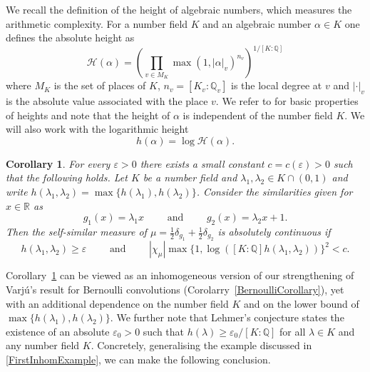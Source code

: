 \documentclass[10pt, english,oneside,reqno]{amsart}
\theoremstyle{plain}
\newtheorem{corollary}[theorem]{Corollary}
\theoremstyle{remark}
\numberwithin{equation}{section}
\numberwithin{figure}{section}
\newcommand{\eps}{\varepsilon}
\newcommand{\Q}{\mathbb{Q}}
\newcommand{\R}{\mathbb{R}}
\begin{document}
    We recall the definition of the height of algebraic numbers, which measures the arithmetic complexity. For a number field $K$ and an algebraic number $\alpha \in K$ one defines the absolute height as  \begin{equation}\label{def:height}
        \mathcal{H}(\alpha) = \left(\prod_{v \in M_K} \max(1, |\alpha|_v)^{n_v} \right)^{1/[K:\Q]}
    \end{equation}
    where $M_K$ is the set of places of $K$, $n_v = [K_v : \mathbb{Q}_v]$ is the local degree at $v$ and $|\cdot|_v$ is the absolute value associated with the place $v$. We refer to \cite{MasserPolynomialsBook} for basic properties of heights and note that the height of $\alpha$ is independent of the number field $K$. We will also work with the logarithmic height 
    \begin{equation}\label{def:logheight}
        h(\alpha) = \log \mathcal{H}(\alpha).
    \end{equation}
    

    \begin{corollary}\label{Dim1Imhomogen}
        For every $\eps > 0$ there exists a small constant $c = c(\eps) > 0$ such that the following holds. Let $K$ be a number field and $\lambda_1,\lambda_2 \in K \cap (0,1)$ and write $h(\lambda_1,\lambda_2) = \max\{ h(\lambda_1), h(\lambda_2) \}$. Consider the similarities given for $x \in \R$ as 
        \begin{equation}\label{EasySimilarities}
            g_1(x) = \lambda_1 x \quad\quad \text{ and } \quad\quad g_2(x) = \lambda_2 x + 1.
        \end{equation}
        Then the self-similar measure of $\mu = \frac{1}{2}\delta_{g_1} + \frac{1}{2}\delta_{g_2}$ is absolutely continuous if $$ h(\lambda_1,\lambda_2) \geq \eps \quad\quad \text{ and } \quad\quad  |\chi_{\mu}| \max\{ 1, \log ([K:\Q] h(\lambda_1,\lambda_2) ) \} ^2 < c.$$
    \end{corollary}

     Corollary~\ref{Dim1Imhomogen} can be viewed as an inhomogeneous version of our strengthening of Varjú's result for Bernoulli convolutions (Corolarry~\ref{BernoulliCorollary}), yet with an additional dependence on the number field $K$ and on the lower bound of $\max\{ h(\lambda_1), h(\lambda_2) \}$. We further note that Lehmer's conjecture states the existence of an absolute $\eps_0 > 0$ such that $h(\lambda) \geq \eps_0/[K:\Q]$ for all $\lambda \in K$ and any number field $K$. Concretely, generalising the example discussed in \eqref{FirstInhomExample}, we can make the following conclusion.
    
\end{document}
